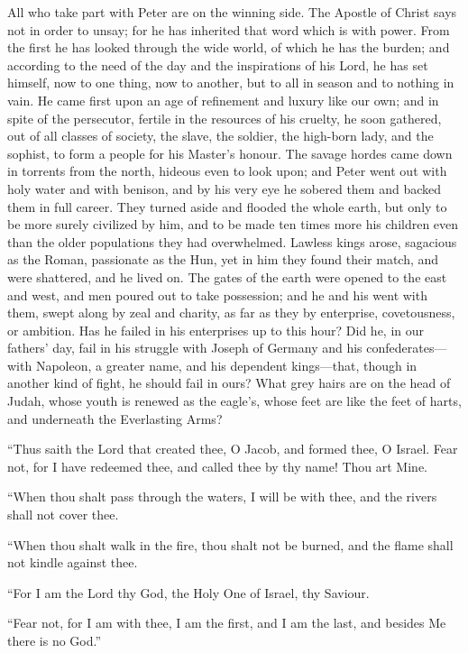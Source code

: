 All who take part with Peter are on the winning
side. The Apostle of Christ says not in order to unsay; for he has
inherited that word which is with power. From the first he has looked
through the wide world, of which he has the burden; and according to
the need of the day and the inspirations of his Lord, he has set
himself, now to one thing, now to another, but to all in season and to
nothing in vain. He came first upon an age of refinement and luxury
like our own; and in spite of the persecutor, fertile in the resources
of his cruelty, he soon gathered, out of all classes of society, the
slave, the soldier, the high-born lady, and the sophist, to form a
people for his Master's honour. The savage hordes came down in
torrents from the north, hideous even to look upon; and Peter went out
with holy water and with benison, and by his very eye he sobered them
and backed them in full career. They turned aside and flooded the
whole earth, but only to be more surely civilized by him, and to be
made ten times more his children even than the older populations they
had overwhelmed. Lawless kings arose, sagacious as the Roman,
passionate as the Hun, yet in him they found their match, and were
shattered, and he lived on. The gates of the earth were opened to the
east and west, and men poured out to take possession; and he and his
went with them, swept along by zeal and charity, as far as they by
enterprise, covetousness, or ambition. Has he failed in his
enterprises up to this hour? Did he, in our fathers' day, fail in his
struggle with Joseph of Germany and his confederates—with Napoleon,
a greater name, and his dependent kings—that, though in another kind
of fight, he should fail in ours? What grey hairs are on the head of
Judah, whose youth is renewed as the eagle's, whose feet are like the
feet of harts, and underneath the Everlasting Arms?

``Thus saith the Lord that created thee, O Jacob,
and formed thee, O Israel. Fear not, for I have redeemed thee, and
called thee by thy name! Thou art Mine.

``When thou shalt pass through the waters, I will
be with thee, and the rivers shall not cover thee.

``When thou shalt walk in the fire, thou shalt not
be burned, and the flame shall not kindle against thee.

``For I am the Lord thy God, the Holy One of
Israel, thy Saviour.

``Fear not, for I am with thee, I am the first,
and I am the last, and besides Me there is no God.''

